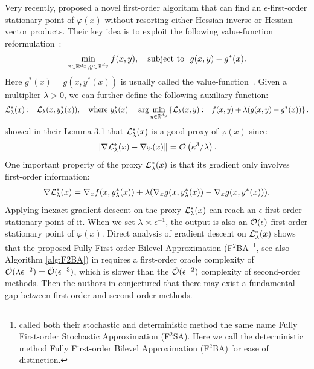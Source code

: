 \documentclass{article}
\begin{document}
Very recently,  \citet{kwon2023fully}  proposed a novel first-order algorithm that can find an $\epsilon$-first-order stationary point of $\varphi(x)$ without resorting either Hessian inverse or Hessian-vector products.  
Their key idea is to exploit the following value-function reformulation~\cite{liu2021value,shen2023penalty,gao2022value,lu2023first,outrata1990numerical,dempe2020bilevel,lin2014solving}:
\begin{align*} 
    \min_{x \in {\mathbb{R}}^{d_x}, y \in {\mathbb{R}}^{d_y}} f(x,y) , \quad {\rm subject ~to}~~ g(x,y) - g^*(x).
\end{align*}
Here $g^*(x) = g(x,y^*(x))$ is usually called the value-function~\cite{ye1995optimality,ye2010new,dempe2002foundations,ye2023difference}. Given a multiplier $\lambda >0$, we can further define the following auxiliary function:
\begin{align}\label{eq:L-lambda}
    {\mathcal{L}}_{\lambda}^*(x) := {\mathcal{L}}_{\lambda}(x,y_{\lambda}^*(x)), \quad {\rm where }~ y_{\lambda}^*(x) = \arg \min_{y \in {\mathbb{R}}^{d_y}} \left\{ {\mathcal{L}}_{\lambda}(x,y):= f(x,y)+ \lambda ( g(x,y) - g^*(x)) \right\}.
\end{align}
\citet{kwon2023fully} showed in their Lemma 3.1 that ${\mathcal{L}}_{\lambda}^*(x)$ is a good proxy of $\varphi(x)$ since 
\begin{align*}
    \Vert \nabla {\mathcal{L}}_{\lambda}^*(x) - \nabla \varphi(x)  \Vert = {\mathcal{O}} \left( \kappa^3 /\lambda \right).
\end{align*}
One important property of the proxy
 ${\mathcal{L}}_{\lambda}^*(x)$ is that its gradient only involves first-order information:
 \begin{align} \label{eq:nabla-Lag}
     \nabla {\mathcal{L}}_{\lambda}^*(x) = \nabla_x f(x, y_{\lambda}^*(x)) + \lambda ( \nabla_x g(x,y_{\lambda}^*(x)) - \nabla_x g(x,y^*(x))).
 \end{align}
Applying inexact gradient descent on the proxy ${\mathcal{L}}_{\lambda}^*(x)$ can reach an $\epsilon$-first-order stationary point of it. When we set $\lambda \asymp \epsilon^{-1}$, the output is also an ${\mathcal{O}}(\epsilon)$-first-order stationary point of $\varphi(x)$. Direct analysis of gradient descent on ${\mathcal{L}}_{\lambda}^*(x)$ shows that the proposed Fully First-order Bilevel Approximation (F${}^2$BA~\footnote{
\citet{kwon2023fully} called  both their 
stochastic and deterministic method the same name Fully First-order Stochastic Approximation
(F${}^2$SA). Here we 
call the deterministic method Fully First-order Bilevel Approximation (F${}^2$BA) for ease of distinction.}, see also Algorithm \ref{alg:F2BA}) in \cite{kwon2023fully}  requires a first-order oracle complexity of $\tilde {{\mathcal{O}}}(\lambda \epsilon^{-2}) = \tilde {{\mathcal{O}}}(\epsilon^{-3} )$, which is slower than the $\tilde {{\mathcal{O}}}(\epsilon^{-2})$ complexity of second-order methods. Then the authors in \cite{kwon2023fully} conjectured that there may exist a fundamental gap between first-order and second-order methods.
\end{document}
